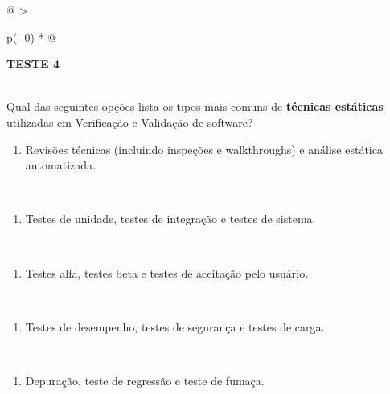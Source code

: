 \documentclass[
]{book}
\providecommand{\tightlist}{%
  \setlength{\itemsep}{0pt}\setlength{\parskip}{0pt}}
\begin{document}
\begin{longtable}[]{@{}
  >{\raggedright\arraybackslash}p{(\columnwidth - 0\tabcolsep) * }@{}}
\toprule\noalign{}
\begin{minipage}[b]{\linewidth}\raggedright
\textbf{TESTE 4}
\end{minipage} \\
\midrule\noalign{}
\endhead
\bottomrule\noalign{}
\endlastfoot
Qual das seguintes opções lista os tipos mais comuns de \textbf{técnicas estáticas} utilizadas em Verificação e Validação de software? \\
\begin{minipage}[t]{\linewidth}\raggedright
\begin{enumerate}
\def\labelenumi{\Alph{enumi})}
\tightlist
\item
  Revisões técnicas (incluindo inspeções e walkthroughs) e análise estática automatizada.
\end{enumerate}
\end{minipage} \\
\begin{minipage}[t]{\linewidth}\raggedright
\begin{enumerate}
\def\labelenumi{\Alph{enumi})}
\setcounter{enumi}{1}
\tightlist
\item
  Testes de unidade, testes de integração e testes de sistema.
\end{enumerate}
\end{minipage} \\
\begin{minipage}[t]{\linewidth}\raggedright
\begin{enumerate}
\def\labelenumi{\Alph{enumi})}
\setcounter{enumi}{2}
\tightlist
\item
  Testes alfa, testes beta e testes de aceitação pelo usuário.
\end{enumerate}
\end{minipage} \\
\begin{minipage}[t]{\linewidth}\raggedright
\begin{enumerate}
\def\labelenumi{\Alph{enumi})}
\setcounter{enumi}{3}
\tightlist
\item
  Testes de desempenho, testes de segurança e testes de carga.
\end{enumerate}
\end{minipage} \\
\begin{minipage}[t]{\linewidth}\raggedright
\begin{enumerate}
\def\labelenumi{\Alph{enumi})}
\setcounter{enumi}{4}
\tightlist
\item
  Depuração, teste de regressão e teste de fumaça.
\end{enumerate}
\end{minipage} \\
\end{longtable}
\end{document}
